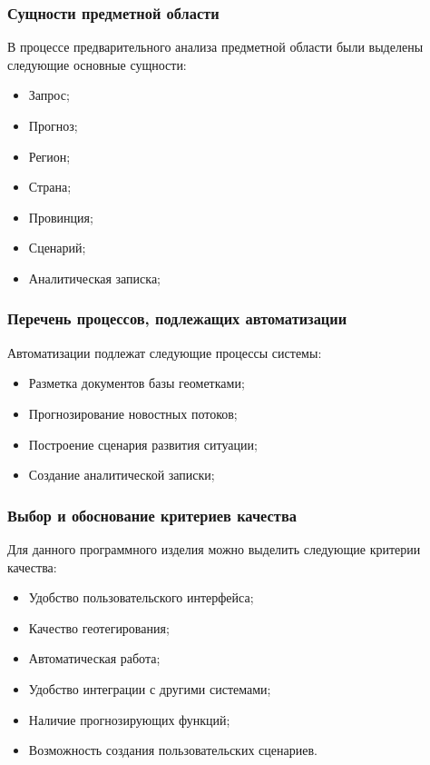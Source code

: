 \subsubsection{Сущности предметной области}

В процессе предварительного анализа предметной области были выделены следующие основные сущности:
\begin{itemize}
\item Запрос;
\item Прогноз;
\item Регион;
\item Страна;
\item Провинция;
\item Сценарий;
\item Аналитическая записка;
\end{itemize}

\subsubsection{Перечень процессов, подлежащих автоматизации}
Автоматизации подлежат следующие процессы системы:
\begin{itemize}
\item Разметка документов базы геометками;
\item Прогнозирование новостных потоков;
\item Построение сценария развития ситуации;
\item Создание аналитической записки;
\end{itemize}

\subsubsection{Выбор и обоснование критериев качества}

Для данного программного изделия можно выделить следующие критерии качества:
\begin{itemize}
\item Удобство пользовательского интерфейса;
\item Качество геотегирования;
\item Автоматическая работа;
\item Удобство интеграции с другими системами;
\item Наличие прогнозирующих функций;
\item Возможность создания пользовательских сценариев.
\end{itemize}

